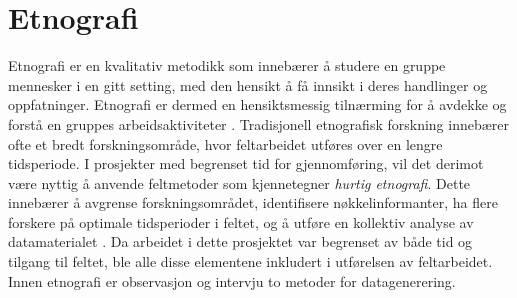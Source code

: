 \section{Etnografi}
\label{section:etnografi} 

Etnografi er en kvalitativ metodikk som innebærer å studere en gruppe mennesker i en gitt setting, med den hensikt å få innsikt i deres handlinger og oppfatninger. Etnografi er dermed en hensiktsmessig tilnærming for å avdekke og forstå en gruppes arbeidsaktiviteter \cite{Blomberg, bmj, Nardi}. Tradisjonell etnografisk forskning innebærer ofte et bredt forskningsområde, hvor feltarbeidet utføres over en lengre tidsperiode. I prosjekter med begrenset tid for gjennomføring, vil det derimot være nyttig å anvende feltmetoder som kjennetegner \textit{hurtig etnografi}. Dette innebærer å avgrense forskningsområdet, identifisere nøkkelinformanter, ha flere forskere på optimale tidsperioder i feltet, og å utføre en kollektiv analyse av datamaterialet \citep{Millen00}. Da arbeidet i dette prosjektet var begrenset av både tid og tilgang til feltet, ble alle disse elementene inkludert i utførelsen av feltarbeidet.
\noindent
Innen etnografi er observasjon og intervju to metoder for datagenerering.



